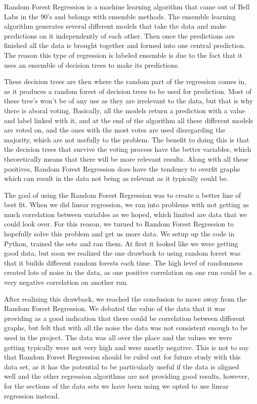 \documentclass[12pt]{report}
\begin{document}
\par Random Forest Regression is a machine learning algorithm that came out of Bell Labs in the 90’s and belongs with ensemble methods. The ensemble learning algorithm generates several different models that take the data and make predictions on it independently of each other. Then once the predictions are finished all the data is brought together and formed into one central prediction. The reason this type of regression is labeled ensemble is due to the fact that it uses an ensemble of decision trees to make its predictions.
\par These decision trees are then where the random part of the regression comes in, as it produces a random forest of decision trees to be used for prediction. Most of these tree’s won't be of any use as they are irrelevant to the data, but that is why there is aboral voting. Basically, all the models return a prediction with a value and label linked with it, and at the end of the algorithm all these different models are voted on, and the ones with the most votes are used disregarding the majority, which are not usefully to the problem. The benefit to doing this is that the decision trees that survive the voting process have the better variables, which theoretically means that there will be more relevant results. Along with all these positives, Random Forest Regression does have the tendency to overfit graphs which can result in the data not being as relevant as it typically could be. 
\par The goal of using the Random Forest Regression was to create a better line of best fit. When we did linear regression, we ran into problems with not getting as much correlation between variables as we hoped, which limited are data that we could look over. For this reason, we turned to Random Forest Regression to hopefully solve this problem and get us more data. We setup up the code in Python, trained the sets and ran them. At first it looked like we were getting good data, but soon we realized the one drawback to using random forest was that it builds different random forests each time. The high level of randomness created lots of noise in the data, as one positive correlation on one run could be a very negative correlation on another run.
\par After realizing this drawback, we reached the conclusion to move away from the Random Forest Regression. We debated the value of the data that it was providing as a good indication that there could be correlation between different graphs, but felt that with all the noise the data was not consistent enough to be used in the project. The data was all over the place and the values we were getting typically were not very high and were mostly negative. This is not to say that Random Forest Regression should be ruled out for future study with this data set, as it has the potential to be particularly useful if the data is aligned well and the other regression algorithms are not providing good results, however, for the sections of the data sets we have been using we opted to use linear regression instead. 
\end{document}
